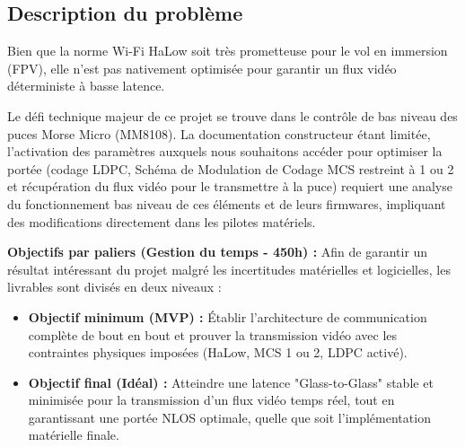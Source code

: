 \subsection{Description du problème}
Bien que la norme Wi-Fi HaLow soit très prometteuse pour le vol en immersion (FPV), elle n'est 
pas nativement optimisée pour garantir un flux vidéo déterministe à basse latence.

Le défi technique majeur de ce projet se trouve dans le contrôle de bas niveau des puces 
Morse Micro (MM8108). La documentation constructeur étant limitée, l'activation des paramètres 
auxquels nous souhaitons accéder pour optimiser la portée (codage LDPC, Schéma de Modulation de 
Codage MCS restreint à 1 ou 2 et récupération du flux vidéo pour le transmettre à la puce)
requiert une analyse du fonctionnement bas niveau de ces éléments et de leurs firmwares, impliquant 
des modifications directement dans les pilotes matériels.\newline

\textbf{Objectifs par paliers (Gestion du temps - 450h) :}\newline
Afin de garantir un résultat intéressant du projet malgré les incertitudes matérielles et 
logicielles, les livrables sont divisés en deux niveaux :

\begin{itemize}
    \item \textbf{Objectif minimum (MVP) :} Établir l'architecture de communication complète de bout 
    en bout et prouver la transmission vidéo avec les contraintes physiques imposées (HaLow, MCS 1 ou 2, LDPC activé).
    \item \textbf{Objectif final (Idéal) :} Atteindre une latence "Glass-to-Glass" stable et minimisée 
    pour la transmission d'un flux vidéo temps réel, tout en garantissant une portée NLOS optimale, quelle 
    que soit l'implémentation matérielle finale.\newline
\end{itemize}


